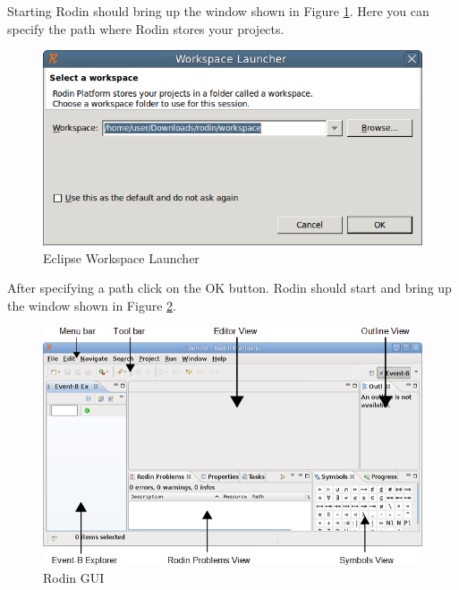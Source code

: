 Starting Rodin should bring up the window shown in Figure \ref{fig_tut_02_workspace_launcher}. Here you can specify the path where Rodin stores your projects.

\begin{figure}[!h]
\begin{center}
	\includegraphics{img/tutorial/tut_02_install1.png}
	\caption{Eclipse Workspace Launcher}
	\label{fig_tut_02_workspace_launcher}
\end{center}
\end{figure}

After specifying a path click on the \textsf{OK} button. Rodin should start and bring up the window shown in Figure \ref{fig_tut_02_rodin_gui}.


\begin{figure}[!h]
\begin{center}
	\includegraphics{img/tutorial/tut_02_install2.png}
	\caption{Rodin GUI}
	\label{fig_tut_02_rodin_gui}
\end{center}
\end{figure}

